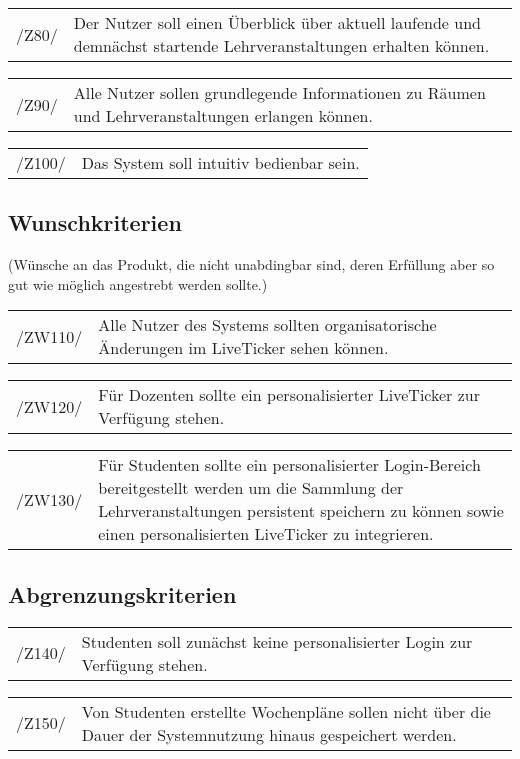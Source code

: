 \begin{tabular}{p{1.5cm}p{14.5cm}}	
	 /Z80/& Der Nutzer soll einen Überblick über aktuell laufende und demnächst startende Lehrveranstaltungen erhalten können. \\[0.25cm]
\end{tabular}

\begin{tabular}{p{1.5cm}p{14.5cm}}	
	 /Z90/& Alle Nutzer sollen grundlegende Informationen zu Räumen und Lehrveranstaltungen erlangen können. \\[0.25cm]
\end{tabular}

\begin{tabular}{p{1.5cm}p{14.5cm}}	
	 /Z100/& Das System soll intuitiv bedienbar sein. \\[0.25cm]
\end{tabular}

\subsection{Wunschkriterien }
(Wünsche an das Produkt, die nicht unabdingbar sind, deren Erfüllung aber so gut wie möglich angestrebt werden sollte.) \\

\begin{tabular}{p{1.5cm}p{14.5cm}}	
	 /ZW110/& Alle Nutzer des Systems sollten organisatorische Änderungen im LiveTicker sehen können. \\[0.25cm]
\end{tabular}

\begin{tabular}{p{1.5cm}p{14.5cm}}	
	 /ZW120/& Für Dozenten sollte ein personalisierter LiveTicker zur Verfügung stehen. \\[0.25cm]
\end{tabular}

\begin{tabular}{p{1.5cm}p{14.5cm}}	
	 /ZW130/& Für Studenten sollte ein personalisierter Login-Bereich bereitgestellt werden um die Sammlung der Lehrveranstaltungen persistent speichern zu können sowie einen personalisierten LiveTicker zu integrieren. \\[0.25cm]
\end{tabular}

\subsection{Abgrenzungskriterien}

\begin{tabular}{p{1.5cm}p{14.5cm}}	
	 /Z140/& Studenten soll zunächst keine personalisierter Login zur Verfügung stehen.  \\[0.25cm]
\end{tabular}

\begin{tabular}{p{1.5cm}p{14.5cm}}	
	 /Z150/& Von Studenten erstellte Wochenpläne sollen nicht über die Dauer der Systemnutzung hinaus gespeichert werden. \\[0.25cm]
\end{tabular}